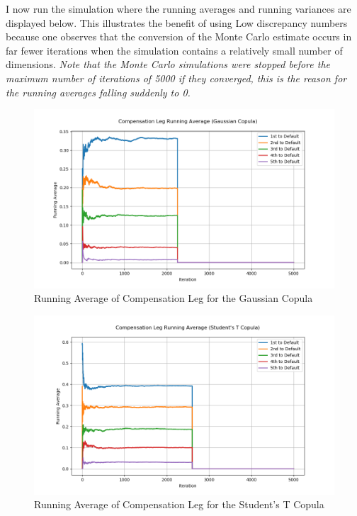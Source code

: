 \documentclass{report}
\theoremstyle{plain}
\theoremstyle{definition}
\begin{document}
I now run the simulation where the running averages and running variances are displayed below. This illustrates the benefit of using Low discrepancy numbers because one observes that the conversion of the Monte Carlo estimate occurs in far fewer iterations when the simulation contains a relatively small number of dimensions. \textit{Note that the Monte Carlo simulations were stopped before the maximum number of iterations of 5000 if they converged, this is the reason for the running averages falling suddenly to 0.}

\begin{figure}[H]
	\begin{center}
		\includegraphics[width=15cm]{Compensation_Leg_Running_Average_(Gaussian_Copula).png}
		\caption{Running Average of Compensation Leg for the Gaussian Copula} 
		\label{Compensation_Leg_Running_Average_(Gaussian_Copula)}
	\end{center}
\end{figure}

\begin{figure}[H]
	\begin{center}
		\includegraphics[width=15cm]{Compensation_Leg_Running_Average_(Student's_T_Copula).png}
		\caption{Running Average of Compensation Leg for the Student's T Copula} 
		\label{Compensation_Leg_Running_Average_(Student's_T_Copula)}
	\end{center}
\end{figure}
\end{document}
